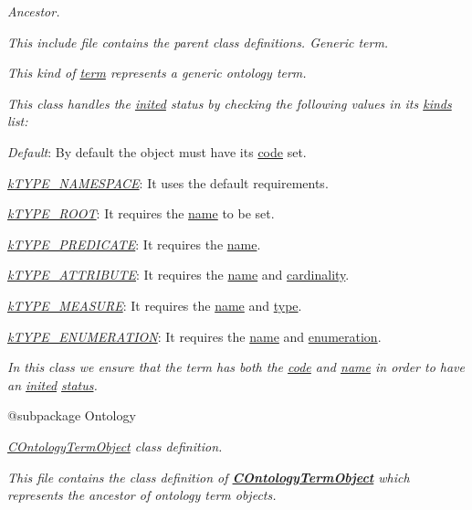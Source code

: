 {\itshape Ancestor.}

{\itshape This include file contains the parent class definitions. Generic term.}

{\itshape This kind of \hyperlink{class_c_ontology_term_object}{term} represents a generic ontology term.}

{\itshape This class handles the \hyperlink{}{inited} status by checking the following values in its \hyperlink{}{kinds} list\-:}

{\itshape 
\begin{DoxyItemize}
\item {\itshape Default}\-: By default the object must have its \hyperlink{}{code} set. 
\item {\itshape \hyperlink{}{k\-T\-Y\-P\-E\-\_\-\-N\-A\-M\-E\-S\-P\-A\-C\-E}}\-: It uses the default requirements. 
\item {\itshape \hyperlink{}{k\-T\-Y\-P\-E\-\_\-\-R\-O\-O\-T}}\-: It requires the \hyperlink{}{name} to be set. 
\item {\itshape \hyperlink{}{k\-T\-Y\-P\-E\-\_\-\-P\-R\-E\-D\-I\-C\-A\-T\-E}}\-: It requires the \hyperlink{}{name}. 
\item {\itshape \hyperlink{}{k\-T\-Y\-P\-E\-\_\-\-A\-T\-T\-R\-I\-B\-U\-T\-E}}\-: It requires the \hyperlink{}{name} and \hyperlink{}{cardinality}. 
\item {\itshape \hyperlink{}{k\-T\-Y\-P\-E\-\_\-\-M\-E\-A\-S\-U\-R\-E}}\-: It requires the \hyperlink{}{name} and \hyperlink{}{type}. 
\item {\itshape \hyperlink{}{k\-T\-Y\-P\-E\-\_\-\-E\-N\-U\-M\-E\-R\-A\-T\-I\-O\-N}}\-: It requires the \hyperlink{}{name} and \hyperlink{}{enumeration}. 
\end{DoxyItemize}}

{\itshape In this class we ensure that the term has both the \hyperlink{}{code} and \hyperlink{}{name} in order to have an \hyperlink{}{inited} \hyperlink{}{status}.}

{\itshape \begin{DoxyVerb} @subpackage        Ontology\end{DoxyVerb}
}

{\itshape {\itshape \hyperlink{class_c_ontology_term_object}{C\-Ontology\-Term\-Object}} class definition.}

{\itshape This file contains the class definition of {\bfseries \hyperlink{class_c_ontology_term_object}{C\-Ontology\-Term\-Object}} which represents the ancestor of ontology term objects.}

